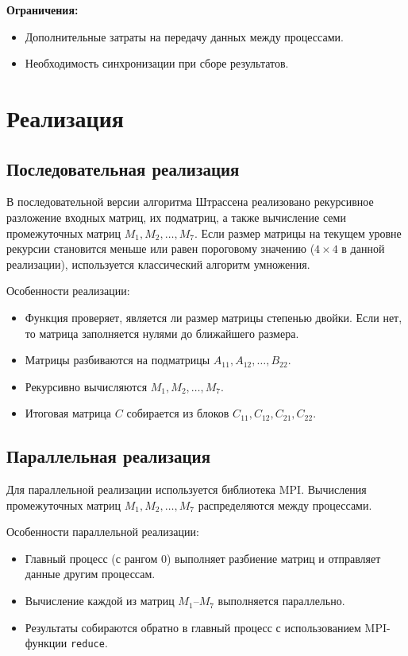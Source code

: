 \documentclass[a4paper, 14pt]{extarticle}
\begin{document}
\textbf{Ограничения:}
\begin{itemize}
    \item Дополнительные затраты на передачу данных между процессами.
    \item Необходимость синхронизации при сборе результатов.
\end{itemize}

    \newpage
    \section{Реализация}
\subsection{Последовательная реализация}
В последовательной версии алгоритма Штрассена реализовано рекурсивное разложение входных матриц, их подматриц, а также вычисление семи промежуточных матриц \(M_1, M_2, \dots, M_7\). Если размер матрицы на текущем уровне рекурсии становится меньше или равен пороговому значению (\(4 \times 4\) в данной реализации), используется классический алгоритм умножения.

Особенности реализации:
\begin{itemize}
    \item Функция проверяет, является ли размер матрицы степенью двойки. Если нет, то матрица заполняется нулями до ближайшего размера.
    \item Матрицы разбиваются на подматрицы \(A_{11}, A_{12}, \dots, B_{22}\).
    \item Рекурсивно вычисляются \(M_1, M_2, \dots, M_7\).
    \item Итоговая матрица \(C\) собирается из блоков \(C_{11}, C_{12}, C_{21}, C_{22}\).
\end{itemize}

\subsection{Параллельная реализация}
Для параллельной реализации используется библиотека MPI. Вычисления промежуточных матриц \(M_1, M_2, \dots, M_7\) распределяются между процессами.

Особенности параллельной реализации:
\begin{itemize}
    \item Главный процесс (с рангом 0) выполняет разбиение матриц и отправляет данные другим процессам.
    \item Вычисление каждой из матриц \(M_1\)–\(M_7\) выполняется параллельно.
    \item Результаты собираются обратно в главный процесс с использованием MPI-функции \texttt{reduce}.
\end{itemize}
\end{document}
